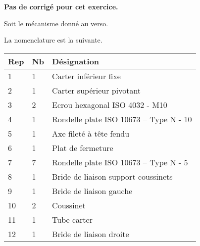 \normalfalse \difficiletrue \tdifficilefalse
\correctionfalse

\setcounter{question}{0}

\ifcorrection
\else
\textbf{Pas de corrigé pour cet exercice.}
\fi

\ifprof
\else
Soit le mécanisme donné au verso.
\fi


\ifprof
\else
La nomenclature est la suivante. 
\begin{multicols}{2}
\begin{center}
\begin{tabular}{|l|l|l|}
\hline
Rep & Nb  & Désignation \\ \hline \hline %
1 & 1 & Carter inférieur fixe  \\ \hline %
2&
1&
Carter supérieur pivotant\\ \hline %
3&
2 &
Ecrou hexagonal ISO 4032 - M10 \\ \hline %
4&
1&
Rondelle plate ISO 10673 – Type N - 10 \\ \hline %
5&
1&
Axe fileté à tête fendu \\ \hline %
6&
1&
Plat de fermeture%
\\ \hline %
7&
7&
Rondelle plate ISO 10673 -- Type N - 5 \\ \hline %
8&
1&
Bride de liaison support coussinets \\ \hline %
9&
1&
Bride de liaison gauche \\ \hline %
10&
2&
Coussinet \\ \hline %
11&
1&
Tube carter \\ \hline %
12&
1&
Bride de liaison droite \\ \hline %

\end{tabular}
\end{center}
\end{multicols}
